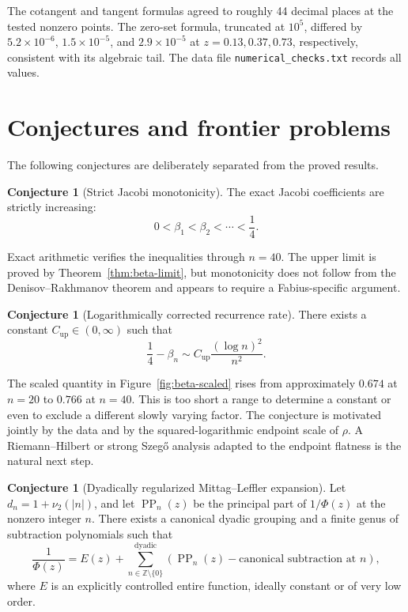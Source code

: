 \documentclass[11pt]{article}
\theoremstyle{definition}
\newtheorem{conjecture}[theorem]{Conjecture}
\theoremstyle{remark}
\newcommand{\Up}{\operatorname{up}}
\begin{document}
The cotangent and tangent formulas agreed to roughly 44 decimal places at the tested
nonzero points.  The zero-set formula, truncated at \(10^5\), differed by
\(5.2\times10^{-6}\), \(1.5\times10^{-5}\), and \(2.9\times10^{-5}\) at
\(z=0.13,0.37,0.73\), respectively, consistent with its algebraic tail.  The data file
\texttt{numerical\_checks.txt} records all values.

\section{Conjectures and frontier problems}

The following conjectures are deliberately separated from the proved results.

\begin{conjecture}[Strict Jacobi monotonicity]\label{conj:beta-monotone}
The exact Jacobi coefficients are strictly increasing:
\begin{equation}
 0<\beta_1<\beta_2<\cdots<\frac14.                            \label{eq:beta-monotone}
\end{equation}
\end{conjecture}

Exact arithmetic verifies the inequalities through \(n=40\).  The upper limit is proved by
Theorem~\ref{thm:beta-limit}, but monotonicity does not follow from the
Denisov--Rakhmanov theorem and appears to require a Fabius-specific argument.

\begin{conjecture}[Logarithmically corrected recurrence rate]\label{conj:beta-rate}
There exists a constant \(C_{\Up}\in(0,\infty)\) such that
\begin{equation}
 \frac14-\beta_n
 \sim C_{\Up}\frac{(\log n)^2}{n^2}.                         \label{eq:beta-rate}
\end{equation}
\end{conjecture}

The scaled quantity in Figure~\ref{fig:beta-scaled} rises from approximately \(0.674\) at
\(n=20\) to \(0.766\) at \(n=40\).  This is too short a range to determine a constant or
even to exclude a different slowly varying factor.  The conjecture is motivated jointly by
the data and by the squared-logarithmic endpoint scale of \(\rho\).  A Riemann--Hilbert or
strong Szeg\H{o} analysis adapted to the endpoint flatness is the natural next step.

\begin{conjecture}[Dyadically regularized Mittag--Leffler expansion]\label{conj:ML}
Let \(d_n=1+\nu_2(|n|)\), and let \(\operatorname{PP}_n(z)\) be the principal part of
\(1/\Phi(z)\) at the nonzero integer \(n\).  There exists a canonical dyadic grouping and a
finite genus of subtraction polynomials such that
\begin{equation}
 \frac1{\Phi(z)}
 =E(z)+\sum_{n\in\mathbb Z\setminus\{0\}}^{\mathrm{dyadic}}
 \left(\operatorname{PP}_n(z)-\text{canonical subtraction at }n\right), \label{eq:ML-conj}
\end{equation}
where \(E\) is an explicitly controlled entire function, ideally constant or of very low
order.
\end{conjecture}
\end{document}
